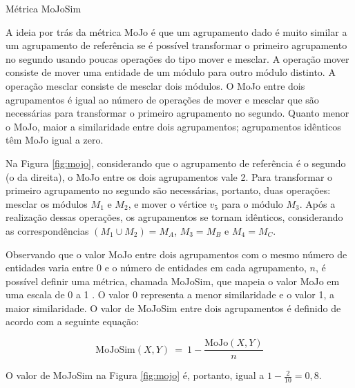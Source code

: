 \begin{chapter}{Métrica MoJoSim}

A ideia por trás da métrica MoJo é que um agrupamento dado é muito similar a um agrupamento de referência se é possível transformar o primeiro agrupamento no segundo usando poucas operações do tipo mover e mesclar. A operação mover consiste de mover uma entidade de um módulo para outro módulo distinto. A operação mesclar consiste de mesclar dois módulos. O MoJo entre  dois agrupamentos é igual ao número de operações de mover e mesclar que são necessárias para transformar o primeiro agrupamento no segundo. Quanto menor o MoJo, maior a similaridade entre dois agrupamentos; agrupamentos idênticos têm MoJo igual a zero.


Na Figura \ref{fig:mojo}, considerando que o agrupamento de referência é o segundo (o da direita), o MoJo entre os dois agrupamentos vale 2. Para transformar o primeiro agrupamento no segundo são necessárias, portanto, duas operações: mesclar os módulos $M_1$ e $M_2$, e mover o vértice $v_5$ para o módulo $M_3$. Após a realização dessas operações, os agrupamentos se tornam idênticos, considerando as correspondências $(M_1 \cup M_2) = M_A$, $M_3 = M_B$ e $M_4 = M_C$.

Observando que o valor MoJo entre dois agrupamentos com o mesmo número de entidades varia entre 0 e o número de entidades em cada agrupamento, $n$, é possível definir uma métrica, chamada MoJoSim, que mapeia o valor MoJo em uma escala de 0 a 1 \cite{Bittencourt2009}. O valor 0 representa a menor similaridade e o valor 1, a maior similaridade. O valor de MoJoSim entre dois agrupamentos é definido de acordo com a seguinte equação:

$$
\mathrm{MoJoSim}(X, Y) ~=~ 1 - \frac{\mathrm{MoJo}(X, Y)}{n}
$$

O valor de MoJoSim na Figura \ref{fig:mojo} é, portanto, igual a $1 - \frac{2}{10} = 0,8$.


\end{chapter}

